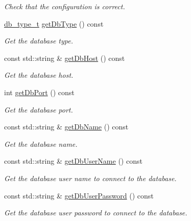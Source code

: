 \begin{DoxyCompactItemize}
\begin{DoxyCompactList}\small\item\em Check that the configuration is correct. \item\end{DoxyCompactList}\item 
\hyperlink{classDbConfiguration_a4a57e43a5017a5c4833a784a994c91cf}{db\_\-type\_\-t} \hyperlink{classDbConfiguration_aa3f2342a112f6fbe49c55dcdf1c0ba06}{getDbType} () const 
\begin{DoxyCompactList}\small\item\em Get the database type. \item\end{DoxyCompactList}\item 
const std::string \& \hyperlink{classDbConfiguration_a1a086da9c68fc4f7486aeb6cdccf190c}{getDbHost} () const 
\begin{DoxyCompactList}\small\item\em Get the database host. \item\end{DoxyCompactList}\item 
int \hyperlink{classDbConfiguration_a990bf4ff748852ddf6c3855947222088}{getDbPort} () const 
\begin{DoxyCompactList}\small\item\em Get the database port. \item\end{DoxyCompactList}\item 
const std::string \& \hyperlink{classDbConfiguration_a3baca98b7587f48e9ce0fe3692ccfee3}{getDbName} () const 
\begin{DoxyCompactList}\small\item\em Get the database name. \item\end{DoxyCompactList}\item 
const std::string \& \hyperlink{classDbConfiguration_ad7574a825957ea574d97310d0e32f642}{getDbUserName} () const 
\begin{DoxyCompactList}\small\item\em Get the database user name to connect to the database. \item\end{DoxyCompactList}\item 
const std::string \& \hyperlink{classDbConfiguration_a24814f0a123ed8afdfc8f0883033bc80}{getDbUserPassword} () const 
\begin{DoxyCompactList}\small\item\em Get the database user password to connect to the database. \item\end{DoxyCompactList}\end{DoxyCompactItemize}
